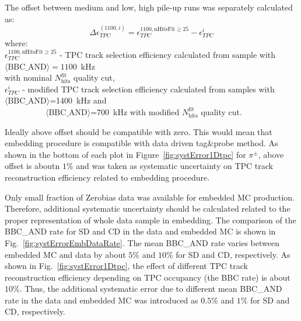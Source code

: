 The offset between medium and low, high pile-up runs was separately calculated as:
\begin{equation}
\Delta\epsilon_{ TPC}^{(1100,i)} = \epsilon_{ TPC}^{1100, \text{nHitsFit}\geq 25}-\epsilon_{ TPC}^{i}
\label{eq:tpcSystDifference}
\end{equation}
where:\\[5pt]
$\epsilon_{ TPC}^{1100, \text{nHitsFit}\geq 25}$ -  TPC track selection efficiency calculated from sample with \mbox{$\langle\text{BBC\_AND}\rangle=1100$~kHz}\\\hspace*{70pt}with nominal $N_{\text{hits}}^{\text{fit}}$ quality cut,\\
$\epsilon_{ TPC}^{i}$ - modified TPC track selection efficiency calculated from  samples with  \mbox{$\langle\text{BBC\_AND}\rangle$=1400~kHz} and \\\mbox{~~~~~~~~~~$\langle\text{BBC\_AND}\rangle$=700~kHz}  with modified $N_{\text{hits}}^{\text{fit}}$ quality cut.

Ideally above offset should be compatible with zero. This would mean that embedding procedure is compatible with data driven tag\&probe method. As shown in  the bottom of each plot in Figure~\ref{fig:systError1Dtpc}  for $\pi^\pm$,  above offset is aboutn $1\%$ and was taken as systematic uncertainty on TPC track reconstruction efficiency related to embedding procedure.





Only small fraction of Zerobias data was available for embedded MC production. Therefore, additional systematic uncertainty should be calculated related to the proper representation of whole data sample in embedding. The comparison of the BBC\_AND rate for SD and CD in the data and embedded MC is shown in Fig.~\ref{fig:systErrorEmbDataRate}. The mean BBC\_AND rate varies between embedded MC and data by about  $5\%$ and $10\%$ for SD and CD, respectively. As shown in Fig.~\ref{fig:systError1Dtpc}, the effect of different TPC track reconstruction efficiency depending on TPC occupancy (the BBC rate) is about $10\%$.  Thus, the additional systematic error due to different mean BBC\_AND rate in the data and embedded MC was introduced as  $0.5\%$ and $1\%$ for SD and CD, respectively.
	
